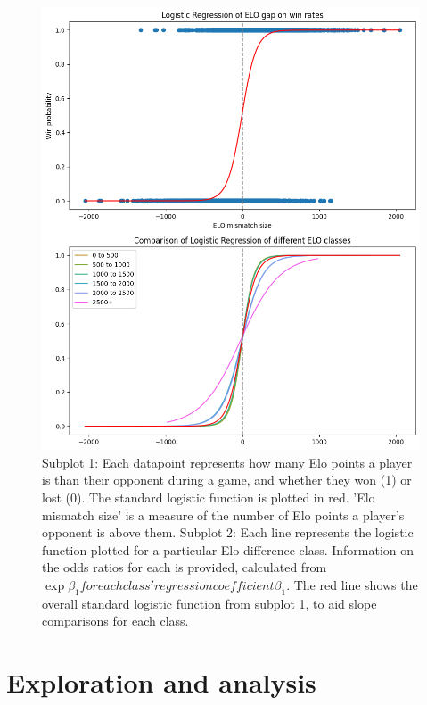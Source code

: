 \documentclass[10pt,a4paper]{article}
\begin{document}
\begin{multicols}{2}
\begin{figure}[p]
  \centering
  \includegraphics[width=\textwidth]{report/images/log_regression_dual.png}
  \caption{Subplot 1: Each datapoint represents how many Elo points a player is than their opponent during a game, and whether they won (1) or lost (0). The standard logistic function is plotted in red. 'Elo mismatch size' is a measure of the number of Elo points a player's opponent is above them. \newline \newline  
  Subplot 2: Each line represents the logistic function plotted for a particular Elo difference class. Information on the odds ratios for each is provided, calculated from $\exp{\beta_{1}} for each class' regression coefficient \beta_{1}$. The red line shows the overall standard logistic function from subplot 1, to aid slope comparisons for each class.}
  \label{fds-project-template:fig:log_regression}
\end{figure}


\section{Exploration and  analysis}


\end{multicols}
\end{document}
